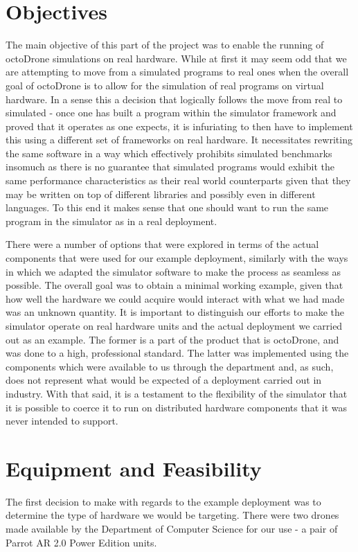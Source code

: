 \section{Objectives}
The main objective of this part of the project was to enable the running of octoDrone simulations on real hardware. While at first it may seem odd that we are attempting to move from a simulated programs to real ones when the overall goal of octoDrone is to allow for the simulation of real programs on virtual hardware. In a sense this a decision that logically follows the move from real to simulated - once one has built a program within the simulator framework and proved that it operates as one expects, it is infuriating to then have to implement this using a different set of frameworks on real hardware. It necessitates rewriting the same software in a way which effectively prohibits simulated benchmarks insomuch as there is no guarantee that simulated programs would exhibit the same performance characteristics as their real world counterparts given that they may be written on top of different libraries and possibly even in different languages. To this end it makes sense that one should want to run the same program in the simulator as in a real deployment.

There were a number of options that were explored in terms of the actual components that were used for our example deployment, similarly with the ways in which we adapted the simulator software to make the process as seamless as possible. The overall goal was to obtain a minimal working example, given that how well the hardware we could acquire would interact with what we had made was an unknown quantity. It is important to distinguish our efforts to make the simulator operate on real hardware units and the actual deployment we carried out as an example. The former is a part of the product that is octoDrone, and was done to a high, professional standard. The latter was implemented using the components which were available to us through the department and, as such, does not represent what would be expected of a deployment carried out in industry. With that said, it is a testament to the flexibility of the simulator that it is possible to coerce it to run on distributed hardware components that it was never intended to support.

\section{Equipment and Feasibility}
The first decision to make with regards to the example deployment was to determine the type of hardware we would be targeting. There were two drones made available by the Department of Computer Science for our use - a pair of Parrot AR 2.0 Power Edition units.

